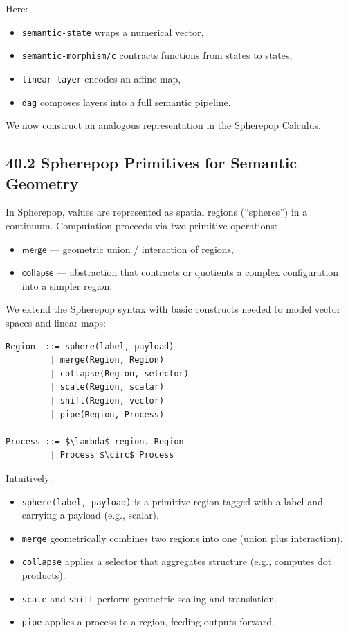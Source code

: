 \documentclass[12pt,letterpaper]{article}
\theoremstyle{remark}
\begin{document}
Here:

\begin{itemize}
  \item \texttt{semantic-state} wraps a numerical vector,
  \item \texttt{semantic-morphism/c} contracts functions from states to states,
  \item \texttt{linear-layer} encodes an affine map,
  \item \texttt{dag} composes layers into a full semantic pipeline.
\end{itemize}

We now construct an analogous representation in the Spherepop Calculus.

\subsection{40.2 Spherepop Primitives for Semantic Geometry}

In Spherepop, values are represented as spatial regions (``spheres'') in a continuum. Computation proceeds via two primitive operations:

\begin{itemize}
  \item $\mathsf{merge}$ --- geometric union / interaction of regions,
  \item $\mathsf{collapse}$ --- abstraction that contracts or quotients a complex configuration into a simpler region.
\end{itemize}

We extend the Spherepop syntax with basic constructs needed to model vector spaces and linear maps:

\begin{verbatim}
Region  ::= sphere(label, payload)
         | merge(Region, Region)
         | collapse(Region, selector)
         | scale(Region, scalar)
         | shift(Region, vector)
         | pipe(Region, Process)

Process ::= $\lambda$ region. Region
         | Process $\circ$ Process
\end{verbatim}

Intuitively:

\begin{itemize}
  \item \verb|sphere(label, payload)| is a primitive region tagged with a label and carrying a payload (e.g., scalar).
  \item \verb|merge| geometrically combines two regions into one (union plus interaction).
  \item \verb|collapse| applies a selector that aggregates structure (e.g., computes dot products).
  \item \verb|scale| and \verb|shift| perform geometric scaling and translation.
  \item \verb|pipe| applies a process to a region, feeding outputs forward.
\end{itemize}
\end{document}
